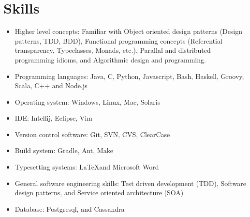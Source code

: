 \section{Skills}
\begin{itemize}
\item Higher level concepts: Familiar with Object oriented design patterns (Design patterns, TDD, BDD), Functional programming concepts (Referential transparency, Typeclasses, Monads, etc.), Parallal and distributed programming idioms, and Algorithmic design and programming.

\item Programming languages: Java, C, Python, Javascript, Bash, Haskell, Groovy, Scala, C++ and Node.js


\item Operating system: Windows, Linux, Mac, Solaris

\item IDE: Intellij, Eclipse, Vim

\item Version control software: Git, SVN, CVS, ClearCase

\item Build system: Gradle, Ant, Make



\item Typesetting systems: \LaTeX and Microsoft Word

\item General software engineering skills: Test driven development (TDD), Software design patterns, and Service oriented architecture (SOA)

\item Database: Postgresql, and Cassandra

\end{itemize}
